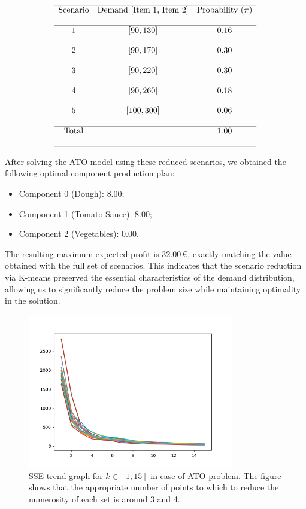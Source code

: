 \documentclass[a4paper,12pt]{article}
\begin{document}
	\[
	\begin{array}{ccc}
		\hline
		\text{Scenario} & \text{Demand [Item 1, Item 2]} & \text{Probability (\(\pi\))} \\\\
		\hline
		1 & [90, 130] & 0.16 \\\\
		2 & [90, 170] & 0.30 \\\\
		3 & [90, 220] & 0.30 \\\\
		4 & [90, 260] & 0.18 \\\\
		5 & [100, 300] & 0.06 \\\\
		\hline
		\text{Total} & & 1.00 \\\\
		\hline
	\end{array}
	\]
	\label{tab:kmeans-ato-results}
	
	After solving the ATO model using these reduced scenarios, we obtained the following optimal component production plan:
	
	\begin{itemize}
		\item Component 0 (Dough): \(8.00\);
		\item Component 1 (Tomato Sauce): \(8.00\);
		\item Component 2 (Vegetables): \(0.00\).
	\end{itemize}
	
	The resulting maximum expected profit is \(32.00\)\,€, exactly matching the value obtained with the full set of scenarios. This indicates that the scenario reduction via K-means preserved the essential characteristics of the demand distribution, allowing us to significantly reduce the problem size while maintaining optimality in the solution.
	
	\begin{figure}[H]
		\centering
		\includegraphics[width=0.8\textwidth]{../immagini/sseATO.png}
		\caption{SSE trend graph for $k \in [1,15]$ in case of ATO problem. The figure shows that the appropriate number of points to which to reduce the numerosity of each set is around 3 and 4.}
		\label{fig:sse-ato}
	\end{figure}
	
\end{document}
